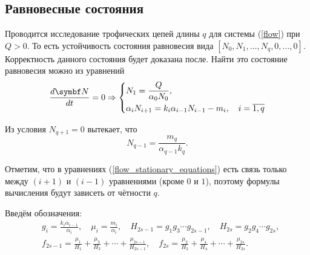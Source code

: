 \subsection{Равновесные состояния}


    Проводится исследование трофических цепей длины \(q\) для системы (\ref{flow}) при \(Q > 0\). То есть устойчивость состояния равновесия вида \(\left[ N_0, N_1, \ldots, N_q, 0, \ldots, 0 \right]\). Корректность данного состояния будет доказана после. Найти это состояние равновесия можно из уравнений
    \begin{equation} \label{flow_stationary_equations}
        \frac{d \mb{N}}{dt} = 0 \Rightarrow
        \left\lbrace\begin{split}
            & N_1 = \frac{Q}{\alpha_0 N_0}, \\
            & \alpha_i N_{i+1} = k_i \alpha_{i-1} N_{i-1} - m_i, \quad i=\overline{1,q}                
        \end{split}\right.
    \end{equation}

    Из условия \( N_{q+1} = 0 \) вытекает, что 
    \begin{equation}
        N_{q-1} = \frac{m_q}{\alpha_{q-1} k_q}.
    \end{equation}

    Отметим, что в уравнениях (\ref{flow_stationary_equations}) есть связь только между \((i+1)\) и \((i-1)\) уравнениями (кроме \(0\) и \(1\)), поэтому формулы вычисления будут зависеть от чётности \(q\).

    Введём обозначения:
    \begin{equation} \label{flow_sub}
        \begin{split}
        & g_i = \frac{k_i \alpha_{i-1}}{\alpha_i}, \quad \mu_i = \frac{m_i}{\alpha_i}, \quad
        H_{2s-1} = g_1 g_3 \cdots g_{2s-1}, \quad H_{2s} = g_2 g_4 \cdots g_{2s}, \\
        & f_{2s-1} = \frac{\mu_1}{H_1} + \frac{\mu_3}{H_3} + \cdots + \frac{\mu_{2s-1}}{H_{2s-1}}, \quad
        f_{2s} = \frac{\mu_2}{H_2} + \frac{\mu_4}{H_4} + \cdots + \frac{\mu_{2s}}{H_{2s}}.
        \end{split}
    \end{equation}

